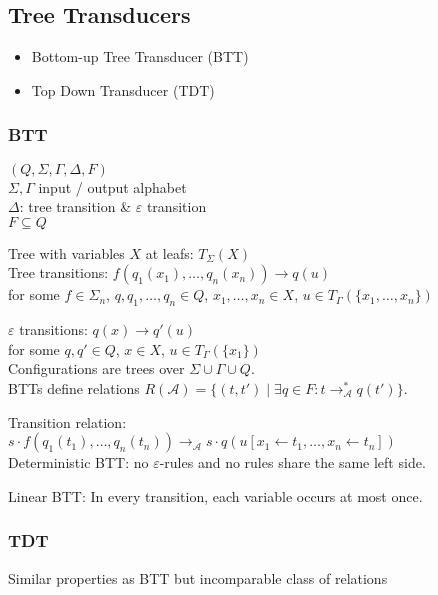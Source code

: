 \documentclass{article}
\begin{document}
\subsection{Tree Transducers}
\begin{itemize}
	\item Bottom-up Tree Transducer (BTT)
	\item Top Down Transducer (TDT)
\end{itemize}

\subsubsection*{BTT}
$(Q, \Sigma, \Gamma, \Delta, F)$ \\
$\Sigma, \Gamma$ input / output alphabet \\
$\Delta$: tree transition \& $\varepsilon$ transition \\
$F \subseteq Q$ 

Tree with variables $X$ at leafs: $T_\Sigma(X)$ \\

Tree transitions: $f(q_1(x_1), \dots, q_n(x_n)) \rightarrow q(u)$ \\
for some $f \in \Sigma_n$, $q, q_1, \dots, q_n \in Q$, $x_1, \dots, x_n \in X$, $u \in T_\Gamma(\{x_1, \dots, x_n\})$

$\varepsilon$ transitions: $q(x) \rightarrow q'(u)$ \\
for some $q, q' \in Q$, $x \in X$, $u \in T_\Gamma(\{x_1\})$ \\

Configurations are trees over $\Sigma \cup \Gamma \cup Q$. \\
BTTs define relations $R(\mathcal{A}) = \{ (t, t') \mid \exists q \in F: t \rightarrow_\mathcal{A}^* q(t')\}$.

Transition relation: $s \cdot f(q_1(t_1), \dots, q_n(t_n)) \rightarrow_\mathcal{A} s \cdot q(u[x_1 \leftarrow t_1, \dots, x_n \leftarrow t_n])$ \\

Deterministic BTT: no $\varepsilon$-rules and no rules share the same left side.

Linear BTT: In every transition, each variable occurs at most once.

\subsubsection*{TDT}
Similar properties as BTT but incomparable class of relations
\end{document}
